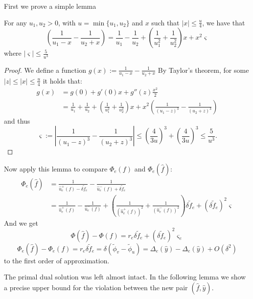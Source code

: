 First we prove a simple lemma
\begin{lemma} \label{augmentation_taylor_fact}
For any $u_1,u_2>0$, with  $u=\min\{u_1,u_2\}$ and $x$ such that $|x|\le\frac{u}{4}$, we have that
\[
\left(\frac{1}{u_1-x}-\frac{1}{u_2+x}\right)
= \frac{1}{u_1}-\frac{1}{u_2}+\left(\frac{1}{u_1^2}+\frac{1}{u_2^2}\right)x+x^2\varsigma
\]
where $|\varsigma|\le\frac{5}{u^3}$
\end{lemma}
\begin{proof}
We define a function 
$g(x) := \frac{1}{u_1-x}-\frac{1}{u_2+x}
$
By Taylor's theorem, for some $|z| \le |x| \le \frac{u}{4}$
it holds that:
\[\begin{split}
g(x)
&= g(0)+g'(0)x+g''(z)\frac{x^2}{2}\\
&= \frac{1}{u_1}+\frac{1}{u_2}+\left(\frac{1}{u_1^2}+\frac{1}{u_2^2}\right)x+x^2\left(\frac{1}{(u_1-z)^3}-\frac{1}{(u_2+z)^3}\right)
\end{split}\]
and thus
\[
\varsigma
:= \left|\frac{1}{(u_1-z)^3}-\frac{1}{(u_2+z)^3}\right|
\le \left(\frac{4}{3u}\right)^3+\left(\frac{4}{3u}\right)^3
\le \frac{5}{u^3}.
\]
\end{proof}

Now apply this lemma to compare $\Phi_e(f)$ and $\Phi_e(\hat f)$:
\[\begin{split}
\Phi_e(\hat f)
&= \frac{1}{\hat u_e^+(f)-\delta\tilde  f_e}-\frac{1}{\hat u_e^-(f)+\delta\tilde  f_e}\\
&= \frac{1}{\hat u_e^+(f)}-\frac{1}{\hat u_e^-(f)}+\left(\frac{1}{(\hat u_e^+(f))^2}+\frac{1}{(\hat u_e^-(f))^2}\right)\delta\tilde  f_e+(\delta\tilde f_e)^2\varsigma
\end{split}\]
And we get
\[
\Phi(\hat f)-\Phi(f) = r_e\delta\tilde  f_e+(\delta\tilde  f_e)^2\varsigma_e
\]
\[
\Phi_e(\hat f)-\Phi_e(f)
= r_e\delta\tilde  f_e
= \delta(\tilde{\phi}_v-\tilde{\phi}_u)
= \Delta_e(\hat y)-\Delta_e(\hat y) + O(\delta^2)
\]
to the first order of approximation.

The primal dual solution was left almost intact. In the following lemma we show a precise upper bound for the violation between the new pair $(\hat f,\hat y)$.

